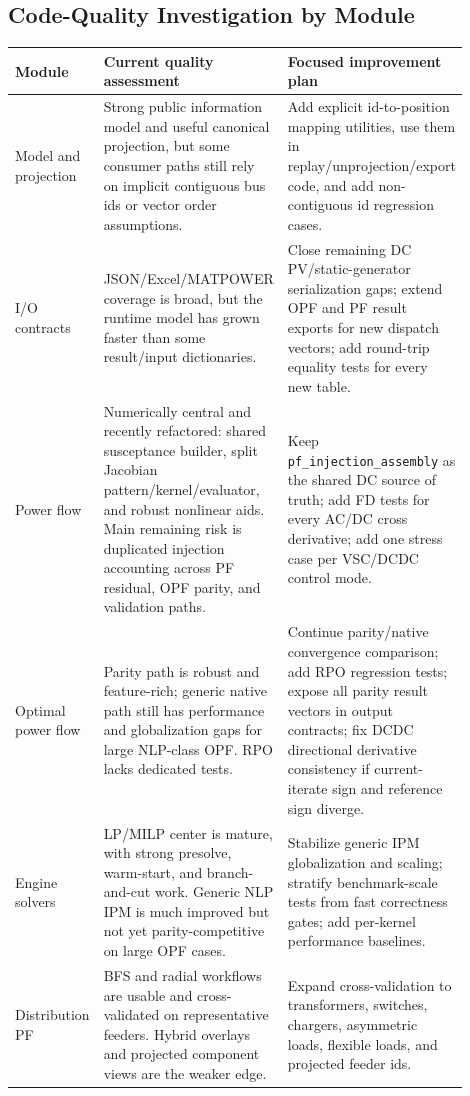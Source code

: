 \subsection{Code-Quality Investigation by Module}

\begin{longtable}{@{}L{0.17\linewidth}L{0.31\linewidth}L{0.42\linewidth}@{}}
\toprule
Module & Current quality assessment & Focused improvement plan \\
\midrule
\endhead
Model and projection & Strong public information model and useful canonical projection, but some consumer paths still rely on implicit contiguous bus ids or vector order assumptions. & Add explicit id-to-position mapping utilities, use them in replay/unprojection/export code, and add non-contiguous id regression cases. \\
I/O contracts & JSON/Excel/MATPOWER coverage is broad, but the runtime model has grown faster than some result/input dictionaries. & Close remaining DC PV/static-generator serialization gaps; extend OPF and PF result exports for new dispatch vectors; add round-trip equality tests for every new table. \\
Power flow & Numerically central and recently refactored: shared susceptance builder, split Jacobian pattern/kernel/evaluator, and robust nonlinear aids.  Main remaining risk is duplicated injection accounting across PF residual, OPF parity, and validation paths. & Keep \texttt{pf\_injection\_assembly} as the shared DC source of truth; add FD tests for every AC/DC cross derivative; add one stress case per VSC/DCDC control mode. \\
Optimal power flow & Parity path is robust and feature-rich; generic native path still has performance and globalization gaps for large NLP-class OPF.  RPO lacks dedicated tests. & Continue parity/native convergence comparison; add RPO regression tests; expose all parity result vectors in output contracts; fix DCDC directional derivative consistency if current-iterate sign and reference sign diverge. \\
Engine solvers & LP/MILP center is mature, with strong presolve, warm-start, and branch-and-cut work.  Generic NLP IPM is much improved but not yet parity-competitive on large OPF cases. & Stabilize generic IPM globalization and scaling; stratify benchmark-scale tests from fast correctness gates; add per-kernel performance baselines. \\
Distribution PF & BFS and radial workflows are usable and cross-validated on representative feeders.  Hybrid overlays and projected component views are the weaker edge. & Expand cross-validation to transformers, switches, chargers, asymmetric loads, flexible loads, and projected feeder ids. \\

\end{longtable}
